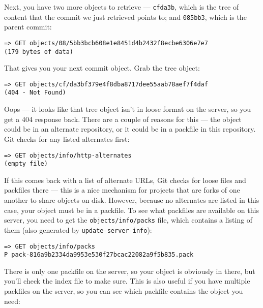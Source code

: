\documentclass[a4paper]{book}
\begin{document}
Next, you have two more objects to retrieve --- \texttt{cfda3b}, which is the tree of content that the commit we just retrieved points to; and \texttt{085bb3}, which is the parent commit:

\begin{shaded}\begin{verbatim}
=> GET objects/08/5bb3bcb608e1e8451d4b2432f8ecbe6306e7e7
(179 bytes of data)
\end{verbatim}\end{shaded}

That gives you your next commit object. Grab the tree object:

\begin{shaded}\begin{verbatim}
=> GET objects/cf/da3bf379e4f8dba8717dee55aab78aef7f4daf
(404 - Not Found)
\end{verbatim}\end{shaded}

Oops --- it looks like that tree object isn't in loose format on the server, so you get a 404 response back. There are a couple of reasons for this --- the object could be in an alternate repository, or it could be in a packfile in this repository. Git checks for any listed alternates first:

\begin{shaded}\begin{verbatim}
=> GET objects/info/http-alternates
(empty file)
\end{verbatim}\end{shaded}

If this comes back with a list of alternate URLs, Git checks for loose files and packfiles there --- this is a nice mechanism for projects that are forks of one another to share objects on disk. However, because no alternates are listed in this case, your object must be in a packfile. To see what packfiles are available on this server, you need to get the \texttt{objects/info/packs} file, which contains a listing of them (also generated by \texttt{update-server-info}):

\begin{shaded}\begin{verbatim}
=> GET objects/info/packs
P pack-816a9b2334da9953e530f27bcac22082a9f5b835.pack
\end{verbatim}\end{shaded}

There is only one packfile on the server, so your object is obviously in there, but you'll check the index file to make sure. This is also useful if you have multiple packfiles on the server, so you can see which packfile contains the object you need:
\end{document}
